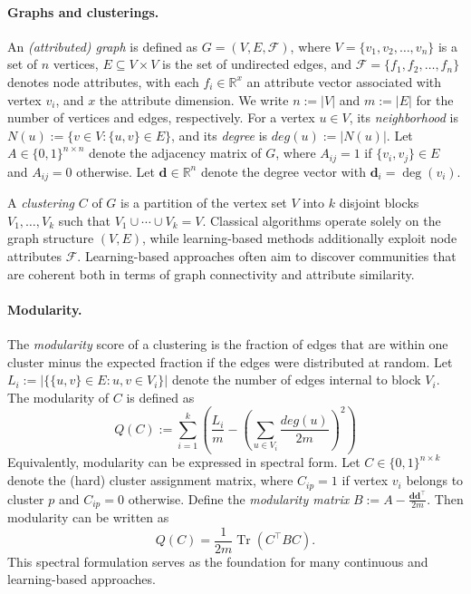 \documentclass[../paper.tex]{subfiles}
\begin{document}
	

\paragraph*{\textbf{Graphs and clusterings}.}
An \emph{(attributed) graph} is defined as $G = (V, E, \mathcal{F})$, where $V = \{v_1, v_2, \dots, v_n\}$ is a set of $n$ vertices, $E \subseteq V \times V$ is the set of undirected edges, and $\mathcal{F} = \{f_1, f_2, \dots, f_n\}$ denotes node attributes, with each $f_i \in \mathbb{R}^x$ an attribute vector associated with vertex $v_i$, and $x$ the attribute dimension.
We write $n := |V|$ and $m := |E|$ for the number of vertices and edges, respectively.
For a vertex $u \in V$, its \emph{neighborhood} is $N(u) := \{v \in V : \{u,v\} \in E\}$, and its \emph{degree} is $deg(u) := |N(u)|$.
Let $A \in \{0,1\}^{n \times n}$ denote the adjacency matrix of $G$, where $A_{ij} = 1$ if $\{v_i,v_j\} \in E$ and $A_{ij} = 0$ otherwise.
Let $\mathbf{d} \in \mathbb{R}^n$ denote the degree vector with $\mathbf{d}_i = \deg(v_i)$.

A \emph{clustering} $C$ of $G$ is a partition of the vertex set $V$ into $k$ disjoint blocks $V_1, \dots, V_k$ such that $V_1 \cup \cdots \cup V_k = V$.
Classical algorithms operate solely on the graph structure $(V,E)$, while learning-based methods additionally exploit node attributes $\mathcal{F}$. 
Learning-based approaches often aim to discover communities that are coherent both in terms of graph connectivity and attribute similarity.

\paragraph*{\textbf{Modularity}.}
The \emph{modularity} score of a clustering is the fraction of edges that are within one cluster minus the expected fraction if the edges were distributed at random.
Let $L_i := |\{\{u,v\} \in E : u,v \in V_i\}|$ denote the number of edges internal to block $V_i$.
The modularity of $C$ is defined as
\[Q(C) := \sum_{i = 1}^{k}{\left(\frac{L_i}{m} - \left(\sum_{u \in V_i}{\frac{deg(u)}{2m}}\right)^2 \right)} \]
Equivalently, modularity can be expressed in spectral form.
Let $C \in \{0,1\}^{n \times k}$ denote the (hard) cluster assignment matrix, where $C_{ip} = 1$ if vertex $v_i$ belongs to cluster $p$ and $C_{ip} = 0$ otherwise.
Define the \emph{modularity matrix}
$ B := A - \frac{\mathbf{d}\mathbf{d}^\top}{2m}.$
Then modularity can be written as
\[ Q(C) = \frac{1}{2m} \operatorname{Tr}(C^\top B C). \]
This spectral formulation serves as the foundation for many continuous and learning-based approaches.
\end{document}
